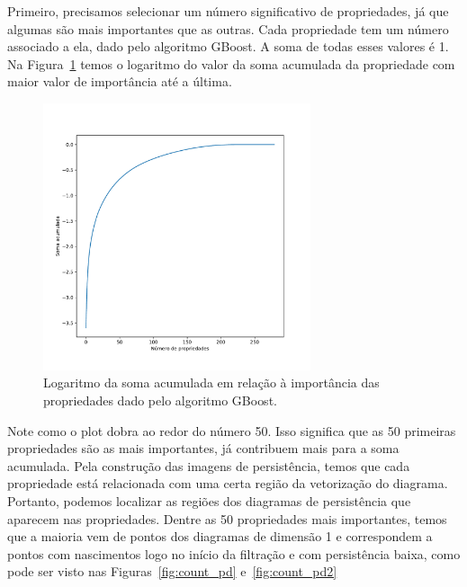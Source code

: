 Primeiro, precisamos selecionar um número significativo de propriedades, já que algumas são
mais importantes que as outras. Cada propriedade tem um número associado a ela, dado pelo
algoritmo GBoost. A soma de todas esses valores é 1. Na Figura~\ref{fig:knee_plot} temos 
o logaritmo do valor da soma acumulada da propriedade com maior valor de importância até a última. 
\begin{figure}
    \centering
    \includegraphics[width=0.7\textwidth]{images/plt_ankle.pdf}
    \caption{Logaritmo da soma acumulada em relação à importância das propriedades dado pelo algoritmo
    GBoost.}
    \label{fig:knee_plot}
    \fautor
\end{figure}
Note como o plot dobra ao redor do número 50. Isso significa que as 50 primeiras propriedades são
as mais importantes, já contribuem mais para a soma acumulada. Pela construção das imagens
de persistência, temos que cada propriedade está relacionada com uma certa região da vetorização
do diagrama. Portanto, podemos localizar as regiões dos diagramas de persistência que 
aparecem nas propriedades. Dentre as 50 propriedades mais importantes, temos que a maioria
vem de pontos dos diagramas de dimensão 1 e correspondem a pontos com nascimentos logo
no início da filtração e com persistência baixa, como pode ser visto nas Figuras~\ref{fig:count_pd}
e~\ref{fig:count_pd2}
